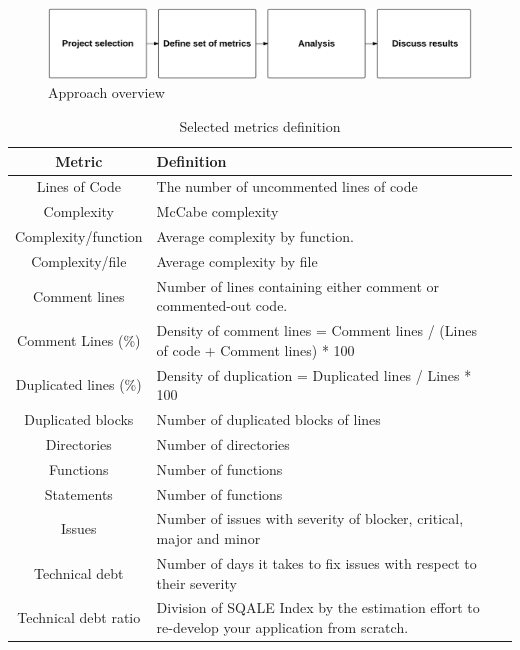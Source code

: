  \begin{figure}[thb!]
 	\caption{Approach overview}
 	\centering
 	\label{fig:approach_overview}
 	\includegraphics[width=1\textwidth]{figures/approach_overview}
 \end{figure}
 
 \begin{table}[!hbt]
 	\begin{center}
 		\caption{Selected metrics definition}
 		\label{tab:metrics_definition}
 		\begin{tabular}{c| l l }
 			\toprule
 			
 			\textbf{Metric} & \textbf{Definition} \\ \midrule
 			Lines of Code & The number of uncommented lines of code    \\
 			Complexity      & McCabe complexity    \\
 			Complexity/function & Average complexity by function. \\
 			Complexity/file & Average complexity by file \\
 			Comment lines  & Number of lines containing either comment or commented-out code. \\
 			Comment Lines (\%)   & Density of comment lines = Comment lines / (Lines of code + Comment lines) * 100    \\
 			Duplicated lines (\%)     & Density of duplication = Duplicated lines / Lines * 100    \\
 			Duplicated blocks   & Number of duplicated blocks of lines    \\
 			Directories   & Number of directories    \\
 			Functions            & Number of functions    \\
 			Statements      & Number of functions   \\
 			Issues    & Number of issues with severity of blocker, critical, major and minor   \\
 			Technical debt    & Number of days it takes to fix issues with respect to their severity    \\
 			Technical debt ratio   & Division of SQALE Index by the estimation effort to re-develop your application from scratch.    \\
 		\end{tabular}
 	\end{center}
 \end{table}
 
